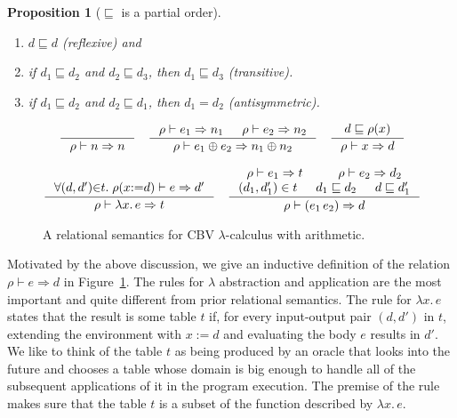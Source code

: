 \documentclass{tufte-handout}
\newcommand{\LAM}[1]{\lambda #1.\,}
\newcommand{\APP}[0]{\,}
\newcommand{\IF}[3]{\mathtt{if}\,#1\,\mathtt{then}\,#2\,\mathtt{else}\,#3}
\newcommand{\by}[0]{\!:=\!}
\newtheorem{proposition}[theorem]{Proposition}
\begin{document}
\begin{proposition}[$\sqsubseteq$ is a partial order]\ 
\label{prop:val-le-refl}\label{prop:val-le-trans}
\begin{enumerate}
\item $d \sqsubseteq d$ (reflexive) and 
\item if $d_1 \sqsubseteq d_2$ and $d_2 \sqsubseteq d_3$,
  then $d_1 \sqsubseteq d_3$ (transitive). 
\item if $d_1 \sqsubseteq d_2$ and $d_2 \sqsubseteq d_1$,
  then $d_1 = d_2$ (antisymmetric).
\end{enumerate}
\end{proposition}

\begin{figure}[tbp]
\hfill{}
\begin{gather*}
  \inference{}{\rho \vdash n \Rightarrow n}
  \quad
  \inference
      {\rho \vdash e_1 \Rightarrow n_1 &
       \rho \vdash e_2 \Rightarrow n_2}
      {\rho \vdash e_1 \oplus e_2 \Rightarrow n_1 \oplus n_2}
  \quad
  \inference
      {d \sqsubseteq \rho(x)}
      {\rho \vdash x \Rightarrow d}
  \\[2ex]
  \inference
      {\forall (d,d'){\in} t.\; \rho(x{:=}d) \vdash e \Rightarrow d'}
      {\rho \vdash \LAM{x}e \Rightarrow t}
  \quad
  \inference
      {\rho \vdash e_1 \Rightarrow t &
       \rho \vdash e_2 \Rightarrow d_2 \\
      (d_1,d_1') \in t & d_1 \sqsubseteq d_2 & d \sqsubseteq d_1'}
      {\rho \vdash (e_1\APP e_2) \Rightarrow d}
\end{gather*}
\caption{A relational semantics for CBV $\lambda$-calculus
  with arithmetic.}
\label{fig:denot-relation}
\end{figure}


Motivated by the above discussion, we give an inductive definition of
the relation $\rho \vdash e \Rightarrow d$ in
Figure~\ref{fig:denot-relation}. The rules for $\lambda$ abstraction
and application are the most important and quite different from prior
relational semantics.
%
The rule for $\LAM{x} e$ states that the result is some table $t$ if,
for every input-output pair $(d,d')$ in $t$, extending the environment
with $x\by d$ and evaluating the body $e$ results in $d'$.  We like to
think of the table $t$ as being produced by an oracle that looks into
the future and chooses a table whose domain is big enough to handle
all of the subsequent applications of it in the program execution.
The premise of the rule makes sure that the table $t$ is a subset of
the function described by $\LAM{x} e$.
\end{document}
